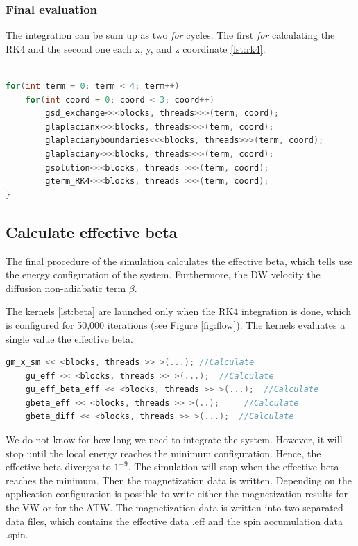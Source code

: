 \subsubsection{Final evaluation}

The integration can be sum up as two \textit{for} cycles. The first \textit{for} calculating the RK4 and the second one each x, y, and z coordinate \ref{lst:rk4}.

\begin{lstlisting}[language=C++, label={lst:rk4}, caption={Summarize of Runge and Kutta 4th Integration}]	

for(int term = 0; term < 4; term++)
	for(int coord = 0; coord < 3; coord++)
    	gsd_exchange<<<blocks, threads>>>(term, coord);
    	glaplacianx<<<blocks, threads>>>(term, coord);
    	glaplacianyboundaries<<<blocks, threads>>>(term, coord);
    	glaplaciany<<<blocks, threads>>>(term, coord);
    	gsolution<<<blocks, threads >>>(term, coord);
    	gterm_RK4<<<blocks, threads >>>(term, coord);
}
\end{lstlisting}


\subsection{Calculate effective beta}

The final procedure of the simulation calculates the effective beta, which tells use the energy configuration of the system. Furthermore, the DW velocity the diffusion non-adiabatic term $\beta$.

The kernels \ref{lst:beta} are launched only when the RK4 integration is done, which is configured for 50,000 iterations (see Figure \ref{fig:flow}). The kernels evaluates a single value the effective beta.

\begin{lstlisting}[language=C++, label={lst:beta}, caption={Calculate effective beta}]
    gm_x_sm << <blocks, threads >> >(...); //Calculate
    gu_eff << <blocks, threads >> >(...);  //Calculate 
    gu_eff_beta_eff << <blocks, threads >> >(...); 	//Calculate
    gbeta_eff << <blocks, threads >> >(..); 	//Calculate
    gbeta_diff << <blocks, threads >> >(...);  //Calculate             
\end{lstlisting}


We do not know for how long we need to integrate the system. However, it will stop until the local energy reaches the minimum configuration. Hence, the effective beta diverges to $1^{-9}$. The simulation will stop when the effective beta reaches the minimum. Then the magnetization data is written. Depending on the application configuration is possible to write either the magnetization results for the VW or for the ATW. The magnetization data is written into two separated data files, which contains the effective data .eff and the spin accumulation data .spin.

